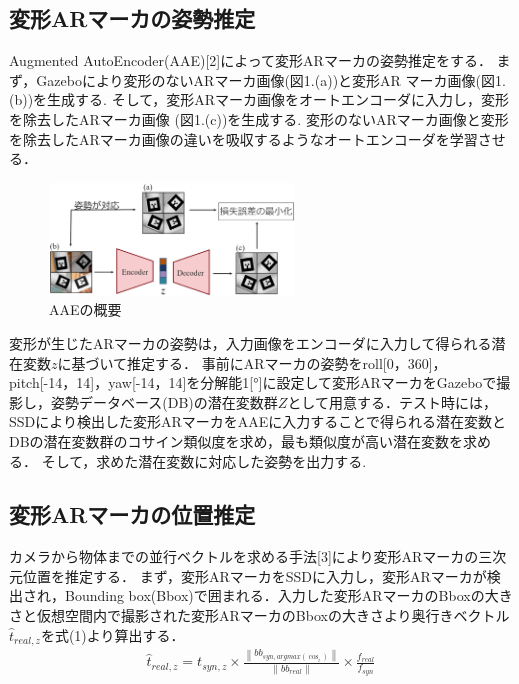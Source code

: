 \documentclass[a4j,twocolumn,10pt]{jarticle}
\begin{document}
\subsection{変形ARマーカの姿勢推定}
Augmented AutoEncoder(AAE)[2]によって変形ARマーカの姿勢推定をする．
まず，Gazeboにより変形のないARマーカ画像(図1.(a))と変形AR マーカ画像(図1.(b))を生成する. 
そして，変形ARマーカ画像をオートエンコーダに入力し，変形を除去したARマーカ画像 (図1.(c))を生成する.
変形のないARマーカ画像と変形を除去したARマーカ画像の違いを吸収するようなオートエンコーダを学習させる．


\vspace{-1.3zh}
\renewcommand{\arraystretch}{1.0}
\begin{figure}[h]
\centering
\includegraphics[width=65mm]{./画像/AAE.eps}
\caption{AAEの概要}
\label{fig:graph3}
\end{figure}
\vspace{-1.0zh}

変形が生じたARマーカの姿勢は，入力画像をエンコーダに入力して得られる潜在変数$z$に基づいて推定する．
事前にARマーカの姿勢をroll[0，360]，pitch[-14，14]，yaw[-14，14]を分解能1[$°$]に設定して変形ARマーカをGazeboで撮影し，姿勢データベース(DB)の潜在変数群$Z$として用意する．テスト時には，SSDにより検出した変形ARマーカをAAEに入力することで得られる潜在変数とDBの潜在変数群のコサイン類似度を求め，最も類似度が高い潜在変数を求める．
そして，求めた潜在変数に対応した姿勢を出力する. 


\subsection{変形ARマーカの位置推定}

カメラから物体までの並行ベクトルを求める手法[3]により変形ARマーカの三次元位置を推定する．
まず，変形ARマーカをSSDに入力し，変形ARマーカが検出され，Bounding box(Bbox)で囲まれる．入力した変形ARマーカのBboxの大きさと仮想空間内で撮影された変形ARマーカのBboxの大きさより奥行きベクトル$\hat{t}_{real,z} $を式(1)より算出する．
\vspace{-1.2zh}
\begin{eqnarray}
\label{sonsitu}
\hat{t}_{real,z}=t_{syn,z} \times \frac{\left\|b b_{ {syn},argmax(\cos_{i})}\right\|} {\left\|b b_{{real}}\right\|} \times \frac{f_{{real}}}{f_{{syn }}}
\end{eqnarray}
\vspace{-2.7zh}
\end{document}
